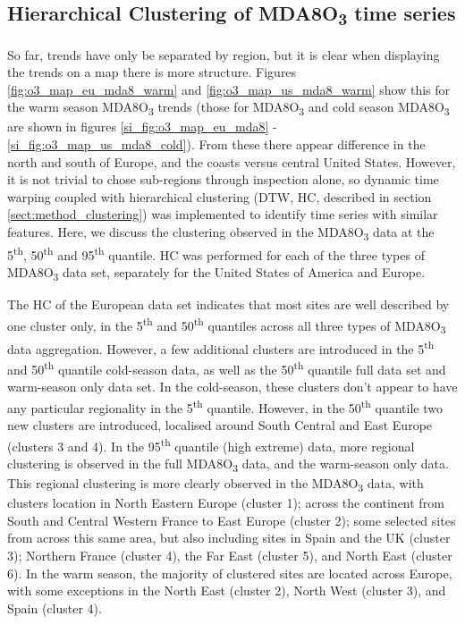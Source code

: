 \documentclass[journal abbreviation, manuscript]{copernicus}
\begin{document}

\subsection{Hierarchical Clustering of MDA8O\textsubscript{3} time series} \label{sect:clustering}

So far, trends have only be separated by region, but it is clear when displaying the trends on a map there is more structure. Figures \ref{fig:o3_map_eu_mda8_warm} and \ref{fig:o3_map_us_mda8_warm} show this for the warm season MDA8O\textsubscript{3} trends (those for MDA8O\textsubscript{3} and cold season MDA8O\textsubscript{3} are shown in figures \ref{si_fig:o3_map_eu_mda8} - \ref{si_fig:o3_map_us_mda8_cold}). From these there appear difference in the north and south of Europe, and the coasts versus central United States. However, it is not trivial to chose sub-regions through inspection alone, so dynamic time warping coupled with hierarchical clustering (DTW, HC, described in section \ref{sect:method_clustering}) was implemented to identify time series with similar features. Here, we discuss the clustering observed in the MDA8O\textsubscript{3} data at the 5\textsuperscript{th}, 50\textsuperscript{th} and 95\textsuperscript{th} quantile. HC was performed for each of the three types of MDA8O\textsubscript{3} data set, separately for the United States of America and Europe. 

The HC of the European data set indicates that most sites are well described by one cluster only, in the 5\textsuperscript{th} and 50\textsuperscript{th} quantiles across all three types of MDA8O\textsubscript{3} data aggregation. However, a few additional clusters are introduced in the 5\textsuperscript{th} and 50\textsuperscript{th} quantile cold-season data, as well as the 50\textsuperscript{th} quantile full data set and warm-season only data set. In the cold-season, these clusters don't appear to have any particular regionality in the 5\textsuperscript{th} quantile. However, in the 50\textsuperscript{th} quantile two new clusters are introduced, localised around South Central and East Europe (clusters 3 and 4). In the 95\textsuperscript{th} quantile (high extreme) data, more regional clustering is observed in the full MDA8O\textsubscript{3} data, and the warm-season only data. This regional clustering is more clearly observed in the MDA8O\textsubscript{3} data, with clusters location in North Eastern Europe (cluster 1); across the continent from South and Central Western France to East Europe (cluster 2); some selected sites from across this same area, but also including sites in Spain and the UK (cluster 3); Northern France (cluster 4), the Far East (cluster 5), and North East (cluster 6). In the warm season, the majority of clustered sites are located across Europe, with some exceptions in the North East (cluster 2), North West (cluster 3), and Spain (cluster 4).
\end{document}
